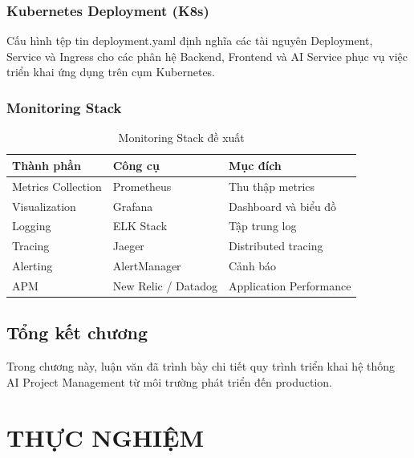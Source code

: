 \documentclass[12pt,a4paper]{report}
\begin{document}
\subsection{Kubernetes Deployment (K8s)}

Cấu hình tệp tin deployment.yaml định nghĩa các tài nguyên Deployment, Service và Ingress cho các phân hệ Backend, Frontend và AI Service phục vụ việc triển khai ứng dụng trên cụm Kubernetes.

\subsection{Monitoring Stack}

\begin{table}[H]
\centering
\caption{Monitoring Stack đề xuất}
\begin{tabular}{|p{4cm}|p{4cm}|p{6cm}|}
\hline
\textbf{Thành phần} & \textbf{Công cụ} & \textbf{Mục đích} \\
\hline
Metrics Collection & Prometheus & Thu thập metrics \\
\hline
Visualization & Grafana & Dashboard và biểu đồ \\
\hline
Logging & ELK Stack & Tập trung log \\
\hline
Tracing & Jaeger & Distributed tracing \\
\hline
Alerting & AlertManager & Cảnh báo \\
\hline
APM & New Relic / Datadog & Application Performance \\
\hline
\end{tabular}
\label{tab:monitoring_stack}
\end{table}

\section{Tổng kết chương}


Trong chương này, luận văn đã trình bày chi tiết quy trình triển khai hệ thống AI Project Management từ môi trường phát triển đến production.

\chapter{THỰC NGHIỆM}
\label{chap:experiments}
\end{document}
